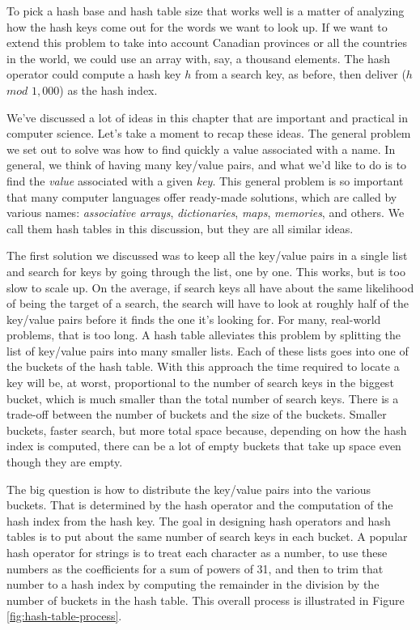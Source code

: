 To pick a hash base and hash table size
that works well is a matter of analyzing how
the hash keys come out for the words we want to look up.
If we want to extend this problem to take into
account Canadian provinces or all the countries in the world, we could
use an array with, say, a thousand elements.
The hash operator could compute a hash key $h$ from a search key,
as before, then deliver ($h$ $mod$ $1,000$) as the hash index.

We've discussed a lot of ideas in this chapter
that are important and practical in computer science.
Let's take a moment to recap these ideas.
The general problem we set out to solve was how to find quickly a value
associated with a name. In general, we think of having many key/value pairs,
and what we'd like to do is to find the \emph{value} associated with a given
\emph{key}. This general problem is so important that many computer languages
offer ready-made solutions, which are called by
various names: \emph{associative arrays}, \emph{dictionaries},
\emph{maps}, \emph{memories}, and others.
We call them hash tables in this discussion,
but they are all similar ideas.

The first solution we discussed was
to keep all the key/value pairs in a single list
and search for keys by going through the list, one by one.
This works, but is too slow to scale up.
On the average, if search keys all have about the same likelihood of
being the target of a search,
the search will have to look at roughly half
of the key/value pairs before it finds the one it's looking for.
For many, real-world problems, that is too long.
A hash table alleviates this problem
by splitting the list of key/value pairs into many smaller lists.
Each of these lists goes into one of the buckets of the hash table.
With this approach the time required to locate a key
will be, at worst, proportional
to the number of search keys in the biggest bucket,
which is much smaller than the total number of search keys.
There is a trade-off between the number of buckets and the size of the buckets.
Smaller buckets, faster search, but more total space because,
depending on how the hash index is computed,
there can be a lot of empty buckets
that take up space even though they are empty.

The big question is how to distribute the key/value pairs into the various buckets.
That is determined by the hash operator and
the computation of the hash index from the hash key.
The goal in designing hash operators and hash tables
is to put about the same number of search keys in each bucket.
A popular hash operator for
strings is to treat each character as a number, to use these numbers as the
coefficients for a sum of powers of 31, and then to trim that number to
a hash index by computing the remainder in the division by
the number of buckets in the hash table.
This overall process is illustrated in Figure \ref{fig:hash-table-process}.

